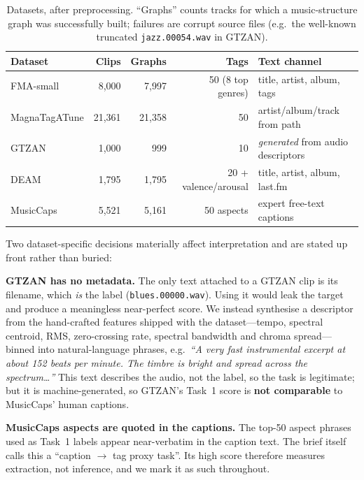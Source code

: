 \documentclass{article}
\begin{document}
\begin{table}[t]
\caption{Datasets, after preprocessing. ``Graphs'' counts tracks for which a
music-structure graph was successfully built; failures are corrupt source files
(e.g.\ the well-known truncated \texttt{jazz.00054.wav} in GTZAN).}
\label{tab:datasets}
\centering
\small
\begin{tabular}{lrrrl}
\toprule
Dataset & Clips & Graphs & Tags & Text channel \\
\midrule
FMA-small       & 8{,}000  & 7{,}997  & 50 (8 top genres) & title, artist, album, tags \\
MagnaTagATune   & 21{,}361 & 21{,}358 & 50                & artist/album/track from path \\
GTZAN           & 1{,}000  & 999      & 10                & \emph{generated} from audio descriptors \\
DEAM            & 1{,}795  & 1{,}795  & 20 + valence/arousal & title, artist, album, last.fm \\
MusicCaps       & 5{,}521  & 5{,}161  & 50 aspects        & expert free-text captions \\
\bottomrule
\end{tabular}
\end{table}

Two dataset-specific decisions materially affect interpretation and are stated up
front rather than buried:

\textbf{GTZAN has no metadata.} The only text attached to a GTZAN clip is its
filename, which \emph{is} the label (\texttt{blues.00000.wav}). Using it would leak
the target and produce a meaningless near-perfect score. We instead synthesise a
descriptor from the hand-crafted features shipped with the dataset---tempo,
spectral centroid, RMS, zero-crossing rate, spectral bandwidth and chroma
spread---binned into natural-language phrases, e.g.\ \emph{``A very fast
instrumental excerpt at about 152 beats per minute. The timbre is bright and
spread across the spectrum\ldots''} This text describes the audio, not the label,
so the task is legitimate; but it is machine-generated, so GTZAN's Task~1 score is
\textbf{not comparable} to MusicCaps' human captions.

\textbf{MusicCaps aspects are quoted in the captions.} The top-50 aspect phrases
used as Task~1 labels appear near-verbatim in the caption text. The brief itself
calls this a ``caption $\rightarrow$ tag proxy task''. Its high score therefore
measures extraction, not inference, and we mark it as such throughout.
\end{document}

